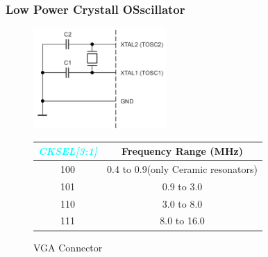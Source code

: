 \documentclass{article}
\newcommand{\bitFormat}[1]{\emph{\textbf{\textcolor{cyan}{#1}}}}
\begin{document}
\subsubsection{Low Power Crystall OSscillator}

\begin{figure}[H]
	\begin{minipage}{.45\textwidth}
		\begin{center}
			\includegraphics[width=0.45\textwidth]{lowPowerCrystallOscillatorCircuit.png}
			\caption{VGA Connector}
		\end{center}
	\end{minipage}
	\begin{minipage}{.5\textwidth}
		\begin{center}
			\begin{tabular}{c|c}
                \bitFormat{CKSEL[3:1]} & \textbf{Frequency Range (MHz)}\\
                \hline
                100 & 0.4 to 0.9(only Ceramic resonators)\\
                101 & 0.9 to 3.0\\
                110 & 3.0 to 8.0\\
                111 & 8.0 to 16.0\\
            \end{tabular}
		\end{center}
	\end{minipage}
\end{figure}
\end{document}
